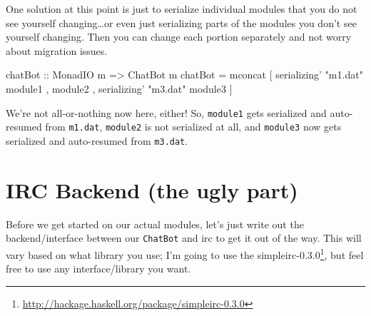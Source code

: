 \documentclass[]{article}
\newenvironment{Shaded}{}{}
\newcommand{\DataTypeTok}[1]{\textcolor[rgb]{0.56,0.13,0.00}{{#1}}}
\newcommand{\StringTok}[1]{\textcolor[rgb]{0.25,0.44,0.63}{{#1}}}
\newcommand{\OtherTok}[1]{\textcolor[rgb]{0.00,0.44,0.13}{{#1}}}
\newcommand{\FunctionTok}[1]{\textcolor[rgb]{0.02,0.16,0.49}{{#1}}}
\newcommand{\NormalTok}[1]{{#1}}
\renewcommand{\href}[2]{#2\footnote{\url{#1}}}
\begin{document}
One solution at this point is just to serialize individual modules that
you do not see yourself changing\ldots{}or even just serializing parts
of the modules you don't see yourself changing. Then you can change each
portion separately and not worry about migration issues.

\begin{Shaded}
\begin{Highlighting}[]
\OtherTok{chatBot ::} \DataTypeTok{MonadIO} \NormalTok{m }\OtherTok{=>} \DataTypeTok{ChatBot} \NormalTok{m}
\NormalTok{chatBot }\FunctionTok{=} \NormalTok{mconcat [ serializing' }\StringTok{"m1.dat"} \NormalTok{module1}
                  \NormalTok{, module2}
                  \NormalTok{, serializing' }\StringTok{"m3.dat"} \NormalTok{module3}
                  \NormalTok{]}
\end{Highlighting}
\end{Shaded}

We're not all-or-nothing now here, either! So, \texttt{module1} gets
serialized and auto-resumed from \texttt{m1.dat}, \texttt{module2} is
not serialized at all, and \texttt{module3} now gets serialized and
auto-resumed from \texttt{m3.dat}.

\section{IRC Backend (the ugly part)}\label{irc-backend-the-ugly-part}

Before we get started on our actual modules, let's just write out the
backend/interface between our \texttt{ChatBot} and irc to get it out of
the way. This will vary based on what library you use; I'm going to use
the
\href{http://hackage.haskell.org/package/simpleirc-0.3.0}{simpleirc-0.3.0},
but feel free to use any interface/library you want.
\end{document}
